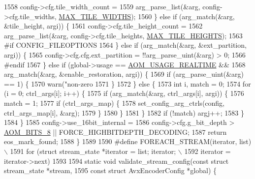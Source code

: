 \begin{DoxyCodeInclude}
{{{{{{{{{{{{{{{{{{{{1558       config->cfg.tile\_width\_count =
1559           arg\_parse\_list(&arg, config->cfg.tile\_widths, \hyperlink{aom__encoder_8h_a3ec4904ea175471a03d10705f384d07c}{MAX\_TILE\_WIDTHS});
1560     \} \textcolor{keywordflow}{else} \textcolor{keywordflow}{if} (arg\_match(&arg, &tile\_height, argi)) \{
1561       config->cfg.tile\_height\_count =
1562           arg\_parse\_list(&arg, config->cfg.tile\_heights, \hyperlink{aom__encoder_8h_a446aae868ff07f3971d9e84b6602a890}{MAX\_TILE\_HEIGHTS});
1563 \textcolor{preprocessor}{#if CONFIG\_FILEOPTIONS}
1564     \} \textcolor{keywordflow}{else} \textcolor{keywordflow}{if} (arg\_match(&arg, &ext\_partition, argi)) \{
1565       config->cfg.cfg.ext\_partition = !!arg\_parse\_uint(&arg) > 0;
1566 \textcolor{preprocessor}{#endif}
1567     \} \textcolor{keywordflow}{else} \textcolor{keywordflow}{if} (global->usage == \hyperlink{group__encoder_gae2cc24d3083099df8eb60ad65f81c62f}{AOM\_USAGE\_REALTIME} &&
1568                arg\_match(&arg, &enable\_restoration, argi)) \{
1569       \textcolor{keywordflow}{if} (arg\_parse\_uint(&arg) == 1) \{
1570         warn(\textcolor{stringliteral}{"non-zero %
1571       \}
1572     \} \textcolor{keywordflow}{else} \{
1573       \textcolor{keywordtype}{int} i, match = 0;
1574       \textcolor{keywordflow}{for} (i = 0; ctrl\_args[i]; i++) \{
1575         \textcolor{keywordflow}{if} (arg\_match(&arg, ctrl\_args[i], argi)) \{
1576           match = 1;
1577           \textcolor{keywordflow}{if} (ctrl\_args\_map) \{
1578             set\_config\_arg\_ctrls(config, ctrl\_args\_map[i], &arg);
1579           \}
1580         \}
1581       \}
1582       \textcolor{keywordflow}{if} (!match) argj++;
1583     \}
1584   \}
1585   config->use\_16bit\_internal =
1586       config->cfg.g\_bit\_depth > \hyperlink{group__codec_gga6ed0e98eba4651c1ad845e39498e4153a4c7f55539160206a3fbb2a6cfc9ef89c}{AOM\_BITS\_8} || FORCE\_HIGHBITDEPTH\_DECODING;
1587   \textcolor{keywordflow}{return} eos\_mark\_found;
1588 \}
1589 
1590 \textcolor{preprocessor}{#define FOREACH\_STREAM(iterator, list)                 \(\backslash\)}
1591 \textcolor{preprocessor}{  for (struct stream\_state *iterator = list; iterator; \(\backslash\)}
1592 \textcolor{preprocessor}{       iterator = iterator->next)}
1593 
1594 \textcolor{keyword}{static} \textcolor{keywordtype}{void} validate\_stream\_config(\textcolor{keyword}{const} \textcolor{keyword}{struct} stream\_state *stream,
1595                                    \textcolor{keyword}{const} \textcolor{keyword}{struct} AvxEncoderConfig *global) \{
}}}}}}}}}}}}}}}}}}}}}
\end{DoxyCodeInclude}

